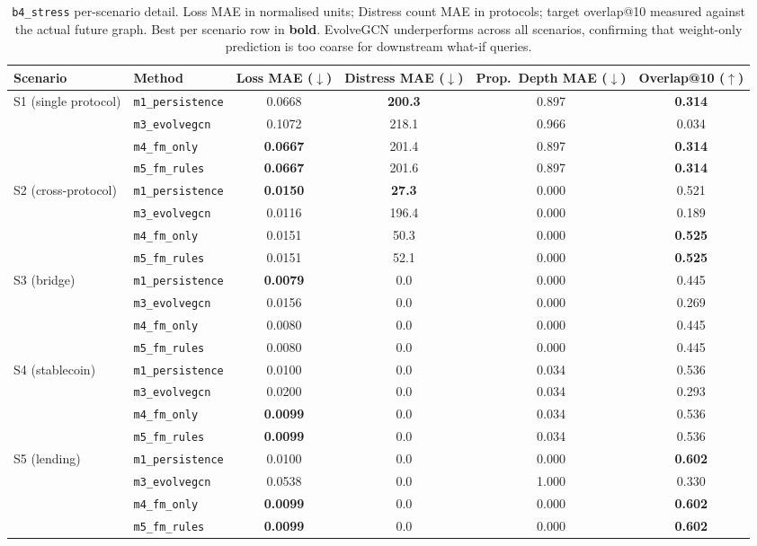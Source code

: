 \begin{table}[t]
\centering
\footnotesize
\setlength{\tabcolsep}{4pt}
\caption{\texttt{b4\_stress} per-scenario detail. Loss MAE in normalised
units; Distress count MAE in protocols; target overlap@10 measured against
the actual future graph. Best per scenario row in \textbf{bold}.
EvolveGCN underperforms across all scenarios, confirming that weight-only
prediction is too coarse for downstream what-if queries.}
\label{tab:b4_detail}
\begin{tabular}{l l c c c c}
\toprule
Scenario & Method & Loss MAE ($\downarrow$) & Distress MAE ($\downarrow$) & Prop.~Depth MAE ($\downarrow$) & Overlap@10 ($\uparrow$) \\
\midrule
\multirow{4}{*}{S1 (single protocol)}
& \texttt{m1\_persistence} & 0.0668 & \textbf{200.3} & 0.897 & \textbf{0.314} \\
& \texttt{m3\_evolvegcn}   & 0.1072 & 218.1 & 0.966 & 0.034 \\
& \texttt{m4\_fm\_only}    & \textbf{0.0667} & 201.4 & 0.897 & \textbf{0.314} \\
& \texttt{m5\_fm\_rules}   & \textbf{0.0667} & 201.6 & 0.897 & \textbf{0.314} \\
\midrule
\multirow{4}{*}{S2 (cross-protocol)}
& \texttt{m1\_persistence} & \textbf{0.0150} & \textbf{27.3} & 0.000 & 0.521 \\
& \texttt{m3\_evolvegcn}   & 0.0116 & 196.4 & 0.000 & 0.189 \\
& \texttt{m4\_fm\_only}    & 0.0151 & 50.3 & 0.000 & \textbf{0.525} \\
& \texttt{m5\_fm\_rules}   & 0.0151 & 52.1 & 0.000 & \textbf{0.525} \\
\midrule
\multirow{4}{*}{S3 (bridge)}
& \texttt{m1\_persistence} & \textbf{0.0079} & 0.0 & 0.000 & 0.445 \\
& \texttt{m3\_evolvegcn}   & 0.0156 & 0.0 & 0.000 & 0.269 \\
& \texttt{m4\_fm\_only}    & 0.0080 & 0.0 & 0.000 & 0.445 \\
& \texttt{m5\_fm\_rules}   & 0.0080 & 0.0 & 0.000 & 0.445 \\
\midrule
\multirow{4}{*}{S4 (stablecoin)}
& \texttt{m1\_persistence} & 0.0100 & 0.0 & 0.034 & 0.536 \\
& \texttt{m3\_evolvegcn}   & 0.0200 & 0.0 & 0.034 & 0.293 \\
& \texttt{m4\_fm\_only}    & \textbf{0.0099} & 0.0 & 0.034 & 0.536 \\
& \texttt{m5\_fm\_rules}   & \textbf{0.0099} & 0.0 & 0.034 & 0.536 \\
\midrule
\multirow{4}{*}{S5 (lending)}
& \texttt{m1\_persistence} & 0.0100 & 0.0 & 0.000 & \textbf{0.602} \\
& \texttt{m3\_evolvegcn}   & 0.0538 & 0.0 & 1.000 & 0.330 \\
& \texttt{m4\_fm\_only}    & \textbf{0.0099} & 0.0 & 0.000 & \textbf{0.602} \\
& \texttt{m5\_fm\_rules}   & \textbf{0.0099} & 0.0 & 0.000 & \textbf{0.602} \\
\bottomrule
\end{tabular}
\end{table}
